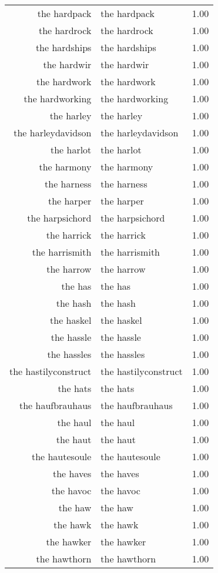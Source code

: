 \begin{table}[ht]
\begin{tabular}{rlr}
  the hardpack & the hardpack & 1.00 \\ 
  the hardrock & the hardrock & 1.00 \\ 
  the hardships & the hardships & 1.00 \\ 
  the hardwir & the hardwir & 1.00 \\ 
  the hardwork & the hardwork & 1.00 \\ 
  the hardworking & the hardworking & 1.00 \\ 
  the harley & the harley & 1.00 \\ 
  the harleydavidson & the harleydavidson & 1.00 \\ 
  the harlot & the harlot & 1.00 \\ 
  the harmony & the harmony & 1.00 \\ 
  the harness & the harness & 1.00 \\ 
  the harper & the harper & 1.00 \\ 
  the harpsichord & the harpsichord & 1.00 \\ 
  the harrick & the harrick & 1.00 \\ 
  the harrismith & the harrismith & 1.00 \\ 
  the harrow & the harrow & 1.00 \\ 
  the has & the has & 1.00 \\ 
  the hash & the hash & 1.00 \\ 
  the haskel & the haskel & 1.00 \\ 
  the hassle & the hassle & 1.00 \\ 
  the hassles & the hassles & 1.00 \\ 
  the hastilyconstruct & the hastilyconstruct & 1.00 \\ 
  the hats & the hats & 1.00 \\ 
  the haufbrauhaus & the haufbrauhaus & 1.00 \\ 
  the haul & the haul & 1.00 \\ 
  the haut & the haut & 1.00 \\ 
  the hautesoule & the hautesoule & 1.00 \\ 
  the haves & the haves & 1.00 \\ 
  the havoc & the havoc & 1.00 \\ 
  the haw & the haw & 1.00 \\ 
  the hawk & the hawk & 1.00 \\ 
  the hawker & the hawker & 1.00 \\ 
  the hawthorn & the hawthorn & 1.00 \\ 

\end{tabular}
\end{table}
